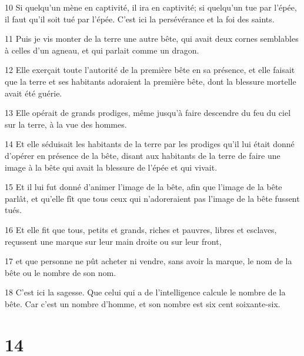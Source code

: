 \par 10 Si quelqu'un mène en captivité, il ira en captivité; si quelqu'un tue par l'épée, il faut qu'il soit tué par l'épée. C'est ici la persévérance et la foi des saints.
\par 11 Puis je vis monter de la terre une autre bête, qui avait deux cornes semblables à celles d'un agneau, et qui parlait comme un dragon.
\par 12 Elle exerçait toute l'autorité de la première bête en sa présence, et elle faisait que la terre et ses habitants adoraient la première bête, dont la blessure mortelle avait été guérie.
\par 13 Elle opérait de grands prodiges, même jusqu'à faire descendre du feu du ciel sur la terre, à la vue des hommes.
\par 14 Et elle séduisait les habitants de la terre par les prodiges qu'il lui était donné d'opérer en présence de la bête, disant aux habitants de la terre de faire une image à la bête qui avait la blessure de l'épée et qui vivait.
\par 15 Et il lui fut donné d'animer l'image de la bête, afin que l'image de la bête parlât, et qu'elle fît que tous ceux qui n'adoreraient pas l'image de la bête fussent tués.
\par 16 Et elle fit que tous, petits et grands, riches et pauvres, libres et esclaves, reçussent une marque sur leur main droite ou sur leur front,
\par 17 et que personne ne pût acheter ni vendre, sans avoir la marque, le nom de la bête ou le nombre de son nom.
\par 18 C'est ici la sagesse. Que celui qui a de l'intelligence calcule le nombre de la bête. Car c'est un nombre d'homme, et son nombre est six cent soixante-six.

\chapter{14}

